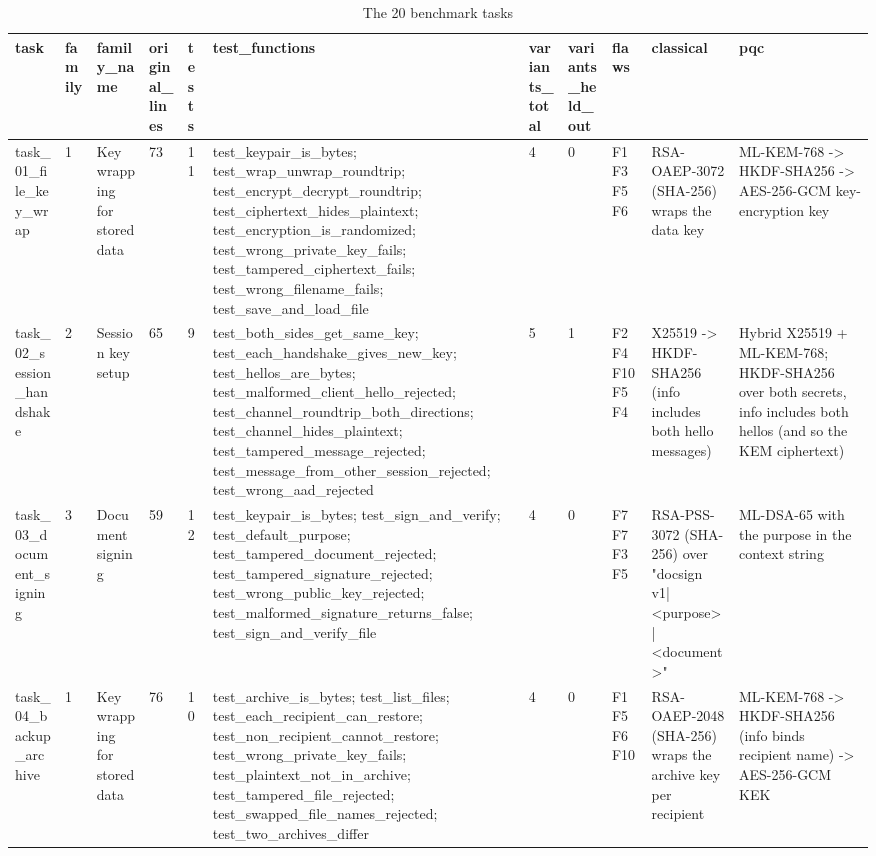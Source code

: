 \begin{table}[t]
\centering
\caption{The 20 benchmark tasks}
\small
\begin{tabular}{lllllllllll}
\hline
task & family & family\_name & original\_lines & tests & test\_functions & variants\_total & variants\_held\_out & flaws & classical & pqc \\
\hline
task\_01\_file\_key\_wrap & 1 & Key wrapping for stored data & 73 & 11 & test\_keypair\_is\_bytes; test\_wrap\_unwrap\_roundtrip; test\_encrypt\_decrypt\_roundtrip; test\_ciphertext\_hides\_plaintext; test\_encryption\_is\_randomized; test\_wrong\_private\_key\_fails; test\_tampered\_ciphertext\_fails; test\_wrong\_filename\_fails; test\_save\_and\_load\_file & 4 & 0 & F1 F3 F5 F6 & RSA-OAEP-3072 (SHA-256) wraps the data key & ML-KEM-768 -> HKDF-SHA256 -> AES-256-GCM key-encryption key \\
task\_02\_session\_handshake & 2 & Session key setup & 65 & 9 & test\_both\_sides\_get\_same\_key; test\_each\_handshake\_gives\_new\_key; test\_hellos\_are\_bytes; test\_malformed\_client\_hello\_rejected; test\_channel\_roundtrip\_both\_directions; test\_channel\_hides\_plaintext; test\_tampered\_message\_rejected; test\_message\_from\_other\_session\_rejected; test\_wrong\_aad\_rejected & 5 & 1 & F2 F4 F10 F5 F4 & X25519 -> HKDF-SHA256 (info includes both hello messages) & Hybrid X25519 + ML-KEM-768; HKDF-SHA256 over both secrets, info includes both hellos (and so the KEM ciphertext) \\
task\_03\_document\_signing & 3 & Document signing & 59 & 12 & test\_keypair\_is\_bytes; test\_sign\_and\_verify; test\_default\_purpose; test\_tampered\_document\_rejected; test\_tampered\_signature\_rejected; test\_wrong\_public\_key\_rejected; test\_malformed\_signature\_returns\_false; test\_sign\_and\_verify\_file & 4 & 0 & F7 F7 F3 F5 & RSA-PSS-3072 (SHA-256) over "docsign v1|<purpose>|<document>" & ML-DSA-65 with the purpose in the context string \\
task\_04\_backup\_archive & 1 & Key wrapping for stored data & 76 & 10 & test\_archive\_is\_bytes; test\_list\_files; test\_each\_recipient\_can\_restore; test\_non\_recipient\_cannot\_restore; test\_wrong\_private\_key\_fails; test\_plaintext\_not\_in\_archive; test\_tampered\_file\_rejected; test\_swapped\_file\_names\_rejected; test\_two\_archives\_differ & 4 & 0 & F1 F5 F6 F10 & RSA-OAEP-2048 (SHA-256) wraps the archive key per recipient & ML-KEM-768 -> HKDF-SHA256 (info binds recipient name) -> AES-256-GCM KEK \\

\end{tabular}
\end{table}
